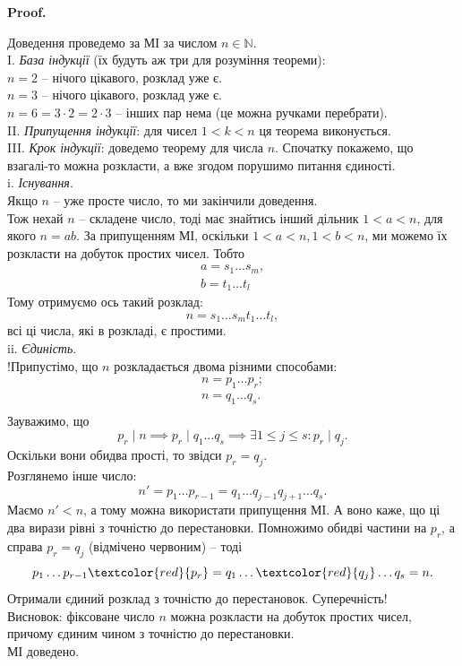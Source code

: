 \documentclass[a4paper, 10pt]{article}
\makeatletter
\theoremstyle{theoremdd}
\theoremstyle{theoremdd}
\theoremstyle{theoremdd}
\theoremstyle{theoremdd}
\theoremstyle{theoremdd}
\theoremstyle{theoremdd}
\theoremstyle{theoremdd}
\theoremstyle{theoremdd}
\renewenvironment{proof}[1][Proof.\\]{\par
\pushQED{\hfill \qed}%
\normalfont \topsep6\p@\@plus6\p@\relax
\trivlist
\item\relax
{\bfseries
#1\@addpunct{.}}\hspace\labelsep\ignorespaces
}{%
\popQED\endtrivlist\@endpefalse
}
\makeatother
\begin{document}
\begin{proof}
Доведення проведемо за МІ за числом $n \in \mathbb{N}$.\\
I. \textit{База індукції} (їх будуть аж три для розуміння теореми): \\
$n = 2$ -- нічого цікавого, розклад уже є.\\
$n = 3$ -- нічого цікавого, розклад уже є.\\
$n = 6 = 3 \cdot 2 = 2 \cdot 3$ -- інших пар нема (це можна ручками перебрати).\\
II. \textit{Припущення індукції}: для чисел $1 < k < n$ ця теорема виконується.\\
III. \textit{Крок індукції}: доведемо теорему для числа $n$. Спочатку покажемо, що взагалі-то можна розкласти, а вже згодом порушимо питання єдиності.
\bigskip \\
i. \textit{Існування}.\\
Якщо $n$ -- уже просте число, то ми закінчили доведення.\\
Тож нехай $n$ -- складене число, тоді має знайтись інший дільник $1 < a < n$, для якого $n = ab$. За припущенням МІ, оскільки $1 < a < n, 1 < b < n$, ми можемо їх розкласти на добуток простих чисел. Тобто
\begin{gather*}
a = s_1 \dots s_m,\\
b = t_1 \dots t_l
\end{gather*}
Тому отримуємо ось такий розклад: 
\[
n = s_1 \dots s_m t_1 \dots t_l,
\] всі ці числа, які в розкладі, є простими.
\bigskip \\
ii. \textit{Єдиність}. \\
!Припустімо, що $n$ розкладається двома різними способами:
\begin{gather*}
n = p_1 \dots p_r;\\
n = q_1 \dots q_s.\\
\end{gather*}
Зауважимо, що \[
p_r \mid n \implies p_r \mid q_1 \dots q_s \implies \exists 1 \leq j \leq s: p_r \mid q_j. \]
Оскільки вони обидва прості, то звідси $p_r = q_j$.\\
Розглянемо інше число: \[
n' = p_1 \dots p_{r-1} = q_1 \dots q_{j-1} q_{j+1} \dots q_s.
\]
Маємо $n' < n$, а тому можна використати припущення МІ. А воно каже, що ці два вирази рівні з точністю до перестановки. Помножимо обидві частини на $p_r$, а справа $p_r = q_j$ (відмічено червоним) -- тоді\\
\[
p_1 \dots p_{r-1} \textcolor{red}{p_r} = q_1 \dots \textcolor{red}{q_j} \dots q_s = n.
\]
Отримали єдиний розклад з точністю до перестановок. Суперечність!\\
Висновок: фіксоване число $n$ можна розкласти на добуток простих чисел, причому єдиним чином з точністю до перестановки.\\
МІ доведено.
\end{proof}
\end{document}
